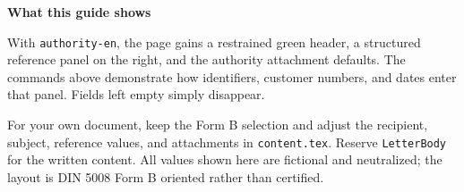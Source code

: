 

\UseRecipientManual
{}


\begin{LetterBody}

\textbf{What this guide shows}

With \texttt{authority-en}, the page gains a restrained green header, a structured reference panel on the right, and the authority attachment defaults. The commands above demonstrate how identifiers, customer numbers, and dates enter that panel. Fields left empty simply disappear.

For your own document, keep the Form B selection and adjust the recipient, subject, reference values, and attachments in \texttt{content.tex}. Reserve \texttt{LetterBody} for the written content. All values shown here are fictional and neutralized; the layout is DIN 5008 Form B oriented rather than certified.

\end{LetterBody}
